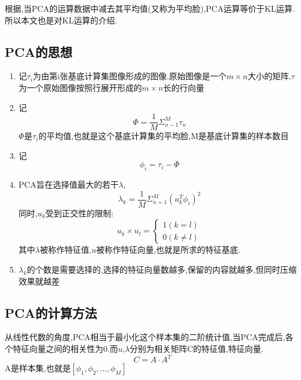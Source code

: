 根据\cite{de2010face, smith2002tutorial},当PCA的运算数据中减去其平均值(又称为平均脸),PCA运算等价于KL运算.所以本文也是对KL运算的介绍.\newline

\subsection{PCA的思想}
\begin{enumerate}
	\item 记$\tau_i$为由第i张基底计算集图像形成的图像.原始图像是一个$m \times n$大小的矩阵,$\tau$为一个原始图像按照行展开形成的$ m \times n$长的行向量
	\item 记\begin{equation}\Phi = \frac{1}{M}\Sigma_{n-1}^M\tau_n\end{equation}$\Phi$是$\tau_i$的平均值,也就是这个基底计算集的平均脸,M是基底计算集的样本数目
	\item 记\begin{equation} \label{Centering} \phi_i = \tau_i - \Phi\end{equation}
	\item PCA旨在选择值最大的若干$\lambda$,\begin{equation} \lambda_k = \frac{1}{M}\Sigma^M_{n=1}(u^T_k \phi_i)^2\end{equation} 同时,$u_k$受到正交性的限制:\begin{equation}\label{pca:corr} u_k \times u_l = \left\{\begin{array}{c}
        1(k = l)\\
        0(k \neq l)
    \end{array}\right.
    \end{equation}其中$\lambda$被称作特征值,$u$被称作特征向量,也就是所求的特征基底.
	\item $\lambda_k$的个数是需要选择的,选择的特征向量数越多,保留的内容就越多,但同时压缩效果就越差
\end{enumerate}
\subsection{PCA的计算方法}
从线性代数的角度,PCA相当于最小化这个样本集的二阶统计值,当PCA完成后,各个特征向量之间的相关性为0.而$u$,$\lambda$分别为相关矩阵C的特征值,特征向量.
\begin{equation}
	C = A \cdot A^T
\end{equation}
A是样本集,也就是$[\phi_1, \phi_2,...,\phi_M]$\\ 

